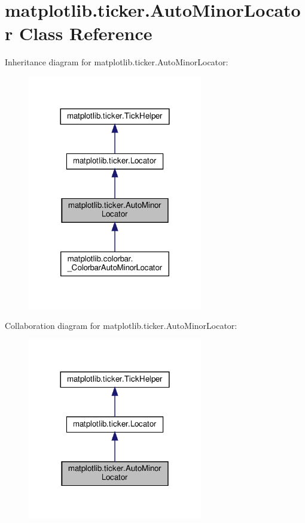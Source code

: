 \hypertarget{classmatplotlib_1_1ticker_1_1AutoMinorLocator}{}\section{matplotlib.\+ticker.\+Auto\+Minor\+Locator Class Reference}
\label{classmatplotlib_1_1ticker_1_1AutoMinorLocator}


Inheritance diagram for matplotlib.\+ticker.\+Auto\+Minor\+Locator\+:
\nopagebreak
\begin{figure}[H]
\begin{center}
\leavevmode
\includegraphics[width=216pt]{classmatplotlib_1_1ticker_1_1AutoMinorLocator__inherit__graph}
\end{center}
\end{figure}


Collaboration diagram for matplotlib.\+ticker.\+Auto\+Minor\+Locator\+:
\nopagebreak
\begin{figure}[H]
\begin{center}
\leavevmode
\includegraphics[width=216pt]{classmatplotlib_1_1ticker_1_1AutoMinorLocator__coll__graph}
\end{center}
\end{figure}
